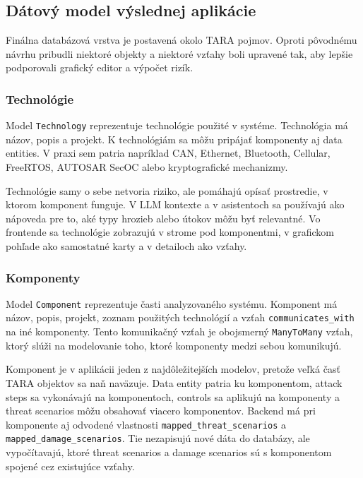 \documentclass[11pt]{article}
\begin{document}
\subsection{Dátový model výslednej aplikácie}

Finálna databázová vrstva je postavená okolo TARA pojmov. Oproti pôvodnému návrhu pribudli niektoré objekty a niektoré vzťahy boli upravené tak, aby lepšie podporovali grafický editor a výpočet rizík.

\subsubsection{Technológie}

Model \texttt{Technology} reprezentuje technológie použité v systéme. Technológia má názov, popis a projekt. K technológiám sa môžu pripájať komponenty aj data entities. V praxi sem patria napríklad CAN, Ethernet, Bluetooth, Cellular, FreeRTOS, AUTOSAR SecOC alebo kryptografické mechanizmy.

Technológie samy o sebe netvoria riziko, ale pomáhajú opísať prostredie, v ktorom komponent funguje. V LLM kontexte a v asistentoch sa používajú ako nápoveda pre to, aké typy hrozieb alebo útokov môžu byť relevantné. Vo frontende sa technológie zobrazujú v strome pod komponentmi, v grafickom pohľade ako samostatné karty a v detailoch ako vzťahy.

\subsubsection{Komponenty}

Model \texttt{Component} reprezentuje časti analyzovaného systému. Komponent má názov, popis, projekt, zoznam použitých technológií a vzťah \texttt{communicates\_with} na iné komponenty. Tento komunikačný vzťah je obojsmerný \texttt{ManyToMany} vzťah, ktorý slúži na modelovanie toho, ktoré komponenty medzi sebou komunikujú.

Komponent je v aplikácii jeden z najdôležitejších modelov, pretože veľká časť TARA objektov sa naň naväzuje. Data entity patria ku komponentom, attack steps sa vykonávajú na komponentoch, controls sa aplikujú na komponenty a threat scenarios môžu obsahovať viacero komponentov. Backend má pri komponente aj odvodené vlastnosti \texttt{mapped\_threat\_scenarios} a \texttt{mapped\_damage\_scenarios}. Tie nezapisujú nové dáta do databázy, ale vypočítavajú, ktoré threat scenarios a damage scenarios sú s komponentom spojené cez existujúce vzťahy.
\end{document}
